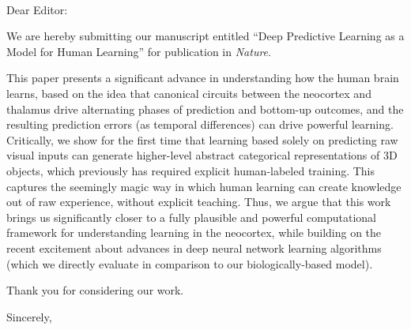 \documentclass[11pt]{letter}
\begin{document}
\begin{letter}
{ \hspace*{.25in}\\}

\opening{Dear Editor:}

We are hereby submitting our manuscript entitled ``Deep Predictive Learning as a Model for Human Learning'' for publication in {\em Nature}.  

This paper presents a significant advance in understanding how the human brain learns, based on the idea that canonical circuits between the neocortex and thalamus drive alternating phases of prediction and bottom-up outcomes, and the resulting prediction errors (as temporal differences) can drive powerful learning.  Critically, we show for the first time that learning based solely on predicting raw visual inputs can generate higher-level abstract categorical representations of 3D objects, which previously has required explicit human-labeled training.  This captures the seemingly magic way in which human learning can create knowledge out of raw experience, without explicit teaching.  Thus, we argue that this work brings us significantly closer to a fully plausible and powerful computational framework for understanding learning in the neocortex, while building on the recent excitement about advances in deep neural network learning algorithms (which we directly evaluate in comparison to our biologically-based model).

Thank you for considering our work.

\closing{Sincerely,}


\end{letter}
\end{document}
